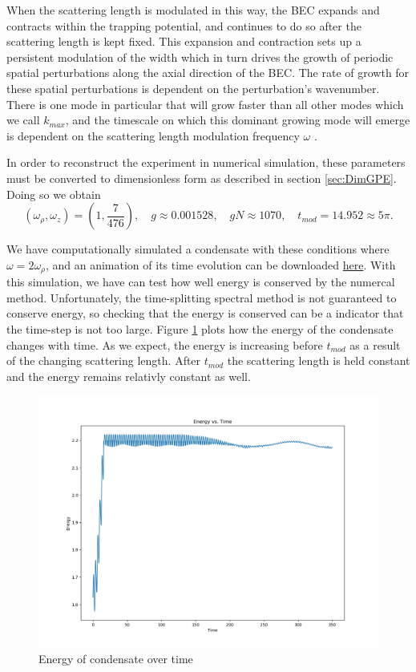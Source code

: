 \documentclass[12]{article}
\begin{document}
When the scattering length is modulated in this way, the BEC expands and contracts within the trapping potential, and continues to do so after the scattering length is kept fixed. This expansion and contraction sets up a persistent modulation of the width which in turn drives the growth of periodic spatial perturbations along the axial direction of the BEC. The rate of growth for these spatial perturbations is dependent on the perturbation's wavenumber. There is one mode in particular that will grow faster than all other modes which we call $k_{max}$, and the timescale on which this dominant growing mode will emerge is dependent on the scattering length modulation frequency $\omega$ \cite{mustafa}. 

In order to reconstruct the experiment in numerical simulation, these parameters must be converted to dimensionless form as described in section \ref{sec:DimGPE}. Doing so we obtain
\begin{equation}
\left(\omega_\rho, \omega_z\right)=(1 , \textstyle\frac{7}{476}), \quad g \approx 0.001528, \quad gN \approx 1070, \quad t_{mod} = 14.952 \approx 5\pi.
\end{equation}

We have computationally simulated a condensate with these conditions where $\omega = 2\omega_\rho$, and an animation of its time evolution can be downloaded \href{https://github.com/TimSkaras/GPE-SpectralMethod/blob/master/Animations/CodnensateAnimation.mp4}{here}. With this simulation, we have can test how well energy is conserved by the numercal method. Unfortunately, the time-splitting spectral method is not guaranteed to conserve energy, so checking that the energy is conserved can be a indicator that the time-step is not too large. Figure \ref{fig:energy} plots how the energy of the condensate changes with time. As we expect, the energy is increasing before $t_{mod}$ as a result of the changing scattering length. After $t_{mod}$ the scattering length is held constant and the energy remains relativly constant as well.

\begin{figure}
\centering
\includegraphics[width=\textwidth]{energyPlot}
\caption{Energy of condensate over time}
\label{fig:energy}
\end{figure}
\end{document}
